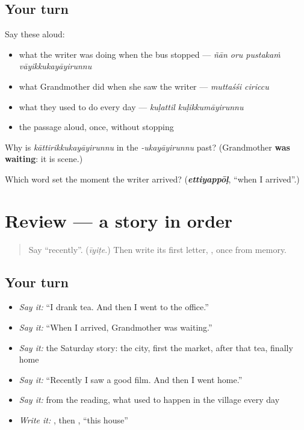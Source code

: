 \subsection*{Your turn}
Say these aloud:

\begin{itemize}
\raggedright
  \item what the writer was doing when the bus stopped — \emph{ñān oru pustakaṁ vāyikkukayāyirunnu}
  \item what Grandmother did when she saw the writer — \emph{muttaśśi ciriccu}
  \item what they used to do every day — \emph{kuḷattil kuḷikkumāyirunnu}
  \item the passage aloud, once, without stopping
\end{itemize}

\begin{tcolorbox}[breakable,colback=teal!4,colframe=teal!35!black,title={Before you move on}]
Why is \emph{kāttirikkukayāyirunnu} in the \emph{-ukayāyirunnu} past? (Grandmother \textbf{was waiting}: it is scene.)

Which word set the moment the writer arrived? (\emph{\textbf{ettiyappōḷ}}, \textquotedblleft{}when I arrived\textquotedblright{}.)
\end{tcolorbox}
\section[(review)]{Review — a story in order}

\label{lesson:ML-R340-a-story-in-order}



\begin{quote}
Say \textquotedblleft{}recently\textquotedblright{}. (\emph{īyiṭe}.) Then write its first letter, \textbf{}, once from memory.
\end{quote}

\subsection*{Your turn}
\begin{itemize}
\raggedright
  \item \emph{Say it:} \textquotedblleft{}I drank tea. And then I went to the office.\textquotedblright{}
  \item \emph{Say it:} \textquotedblleft{}When I arrived, Grandmother was waiting.\textquotedblright{}
  \item \emph{Say it:} the Saturday story: the city, first the market, after that tea, finally home
  \item \emph{Say it:} \textquotedblleft{}Recently I saw a good film. And then I went home.\textquotedblright{}
  \item \emph{Say it:} from the reading, what used to happen in the village every day
  \item \emph{Write it:} \textbf{}, then \textbf{ }, \textquotedblleft{}this house\textquotedblright{}
\end{itemize}

